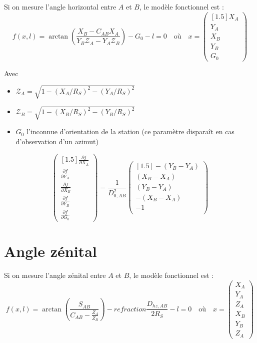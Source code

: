 \documentclass[french]{report}
\begin{document}
Si on mesure l'angle horizontal entre $A$ et $B$, le modèle fonctionnel est :
$$ f(x,l)=\arctan \left( \frac{X_B - C_{AB} X_A}{Y_B \mathcal{Z}_A - Y_A \mathcal{Z}_B} \right) - G_0 - l = 0
\quad \text{où} \quad x=
\begin{pmatrix}[1.5] X_A\\ Y_A\\ X_B\\ Y_B \\ G_0\end{pmatrix}$$

Avec
\begin{itemize}
\item $\mathcal{Z}_A = \sqrt{1-(X_A/R_S)^2-(Y_A/R_S)^2}$
\item $\mathcal{Z}_B = \sqrt{1-(X_B/R_S)^2-(Y_B/R_S)^2}$
\item $G_0$ l'inconnue d'orientation de la station (ce paramètre disparaît en cas d'observation d'un azimut)
\end{itemize}

$$\begin{pmatrix}[1.5]
\frac{\partial f}{\partial X_A}\\
\frac{\partial f}{\partial Y_A}\\
\frac{\partial f}{\partial X_B}\\
\frac{\partial f}{\partial Y_B}\\
\frac{\partial f}{\partial G_0} \end{pmatrix}
= \frac{1}{D_{0, AB}^2}
\begin{pmatrix}[1.5]
-(Y_B-Y_A) \\
(X_B-X_A) \\
(Y_B-Y_A) \\
-(X_B-X_A) \\
-1 \\
\end{pmatrix}$$



\section{Angle zénital}
\label{sec:angle_zenital}
Si on mesure l'angle zénital entre $A$ et $B$, le modèle fonctionnel est :
$$ f(x,l)=\arctan \left( \frac{S_{AB} } {C_{AB} - \frac{Z_A}{Z_B}} \right) - refraction\frac{D_{hz,AB}}{2 R_S} - l = 0
\quad \text{où} \quad x=
\begin{pmatrix} X_A\\ Y_A\\  Z_A\\ X_B\\ Y_B \\ Z_A \end{pmatrix}$$
\end{document}
